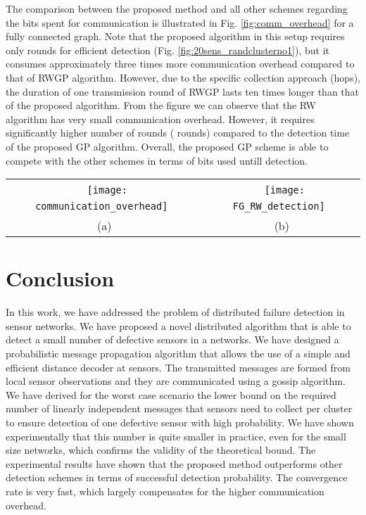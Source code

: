 \documentclass[journal]{IEEEtran}
\begin{document}
The comparison between the proposed method and all other  schemes regarding the bits spent for communication is illustrated in Fig. \ref{fig:comm_overhead} for a fully connected graph. Note that the proposed algorithm in this setup requires only  rounds for efficient detection (Fig. \ref{fig:20sens_randclusterno1}), but it consumes approximately three times more communication overhead compared to that of RWGP algorithm. However, due to the specific collection approach (hops), the duration of one transmission round of RWGP lasts ten times longer than that of the proposed algorithm. From the figure we can observe that the RW algorithm has very small communication overhead. However, it requires significantly higher number of rounds ( rounds) compared to the detection time of the proposed GP algorithm. Overall, the proposed GP scheme is able to compete with the other schemes in terms of bits used untill detection. 

\begin{figure*}[htb]
\begin{center}
\begin{tabular}{cc}
~\texttt{[image: communication\_overhead]}~&
~\texttt{[image: FG\_RW\_detection]}~\\
~(a)~&~(b)~\\\end{tabular}
\end{center}
\caption{(a)Comparison of the communication overhead for several algorithms, for the following parameter values: . Graph is fully connected. Abbreviations: GP: Proposed method, RWGP: Random Walk rounds with gossip algorithm and pull protocol dissemination, RW: Random Walk in the network initiated at  sensors. (b) Comparison of detection vs. number of rounds of the distributed detection scheme.}
\label{fig:comm_overhead}
\end{figure*}



\section{Conclusion}\label{sec:discuss}
In this work, we have addressed the problem of distributed failure detection in sensor networks. We have proposed a novel distributed algorithm that is able to detect a small number of defective sensors in a networks. We have designed a probabilistic message propagation algorithm that allows the use of a simple and efficient distance decoder at sensors. The transmitted messages are formed from local sensor observations and they are communicated using a gossip algorithm. We have derived for the worst case scenario the lower bound on the required number of linearly independent messages that sensors need to collect per cluster to ensure detection of one defective sensor with high probability. We have shown experimentally that this number is quite smaller in practice, even for the small size networks, which confirms the validity of the theoretical bound. The experimental results have shown that the proposed method outperforms other detection schemes in terms of successful detection probability. The convergence rate is very fast, which largely compensates for the higher communication overhead.
\end{document}
